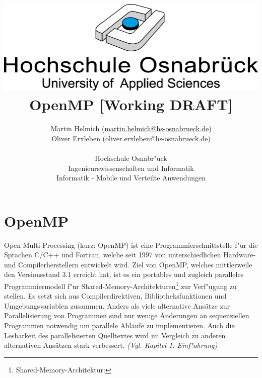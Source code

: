 \documentclass[11pt]{scrartcl}
\begin{document}
\author{%
	Martin Helmich \small(\href{mailto:martin.helmich@hs-osnabrueck.de}{martin.helmich@hs-osnabrueck.de})\\%
	Oliver Erxleben \small(\href{mailto:oliver.erxleben@hs-osnabrueck.de}{oliver.erxleben@hs-osnabrueck.de})\\ \\%
	Hochschule Osnabr"uck \\%
	Ingenieurswissenschaften und Informatik \\%
	Informatik - Mobile und Verteilte Anwendungen }

\title{\includegraphics[scale=0.75,keepaspectratio]{img/hs_os.png}\linebreak \linebreak
OpenMP [Working DRAFT]}

\maketitle
\thispagestyle{empty}
\tableofcontents

\pagebreak
\pagestyle{plain}
\setcounter{page}{1} 

\section{OpenMP} Open Multi-Processing (kurz: OpenMP) ist eine Programmierschnittstelle
f"ur die Sprachen C/C++ und Fortran, welche seit 1997 von unterschiedlichen Hardware- und Compilerherstellern entwickelt wird. Ziel von OpenMP, welches mittlerweile den
Versionsstand 3.1 erreicht hat, ist es ein portables und zugleich paralleles
Programmiermodell f"ur Shared-Memory-Architekturen\footnote{Shared-Memory-Architektur: } zur Verf"ugung zu stellen. Es setzt sich aus Compilerdirektiven, Bibliotheksfunktionen und Umgebungsvariablen zusammen. Anders als viele alternative Ansätze zur Parallelisierung von Programmen sind nur wenige Änderungen an sequenziellen Programmen notwendig um parallele Abläufe zu implementieren. Auch die Lesbarkeit des parallelisierten Quelltextes wird im Vergleich zu anderen alternativen Ansätzen stark verbessert. \textit{(Vgl. \cite{omp08} Kapitel 1: Einf"uhrung)}
\end{document}
